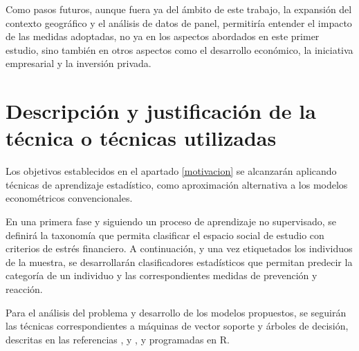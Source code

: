 \documentclass[a4paper, 11pt, bibliography=numbered, es]{article}
\begin{document}
Como pasos futuros, aunque fuera ya del ámbito de este trabajo, la expansión del contexto geográfico y el análisis de datos de panel, permitiría entender el impacto de las medidas 
adoptadas, no ya en los aspectos abordados en este primer estudio, sino también en otros
aspectos como el desarrollo económico, la iniciativa empresarial y la inversión privada. 
\section{Descripción y justificación de la técnica o técnicas utilizadas}
Los objetivos establecidos en el apartado \ref{motivacion} se alcanzarán 
aplicando técnicas de aprendizaje estadístico, como aproximación alternativa a los modelos econométricos convencionales. 

En una primera fase y siguiendo un proceso de aprendizaje no supervisado, se definirá la taxonomía que permita clasificar el espacio social de estudio con criterios de estrés financiero. A continuación, y una vez etiquetados los individuos de la muestra, se 
desarrollarán clasificadores estadísticos que permitan predecir la categoría de un 
individuo y las correspondientes medidas de prevención y reacción. 

Para el análisis del problema y desarrollo de los modelos propuestos, se seguirán las 
técnicas correspondientes a máquinas de vector soporte y árboles de decisión, descritas en las referencias \cite{lantz23}, \cite{Hastie23} y \cite{Hastie13}, y programadas en R\cite{R24}.
\printbibliography 
\end{document}
